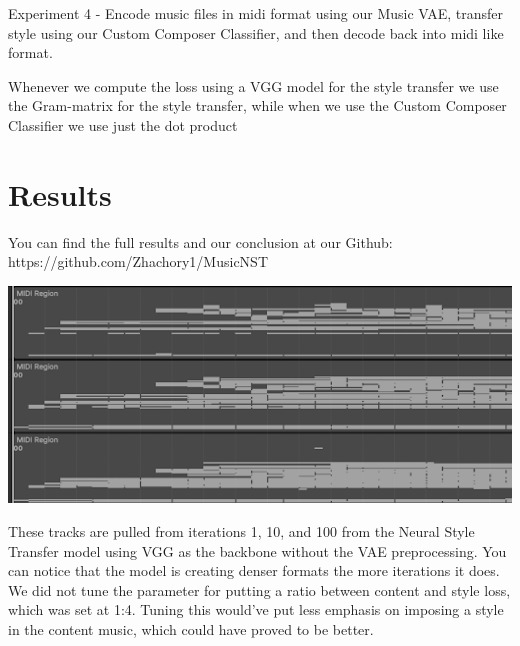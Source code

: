 \documentclass{article}
\begin{document}
Experiment 4 - Encode music files in midi format using our Music VAE, transfer style using our Custom Composer Classifier, and then decode back into midi like format.

Whenever we compute the loss using a VGG model for the style transfer we use the Gram-matrix for the style transfer, while when we use the Custom Composer Classifier we use just the dot product

\section{Results}
\label{results}

You can find the full results and our conclusion at our Github: https://github.com/Zhachory1/MusicNST

\centerline{\includegraphics[width=\columnwidth]{tracks}}

These tracks are pulled from iterations 1, 10, and 100 from the Neural Style Transfer model using VGG as the backbone without the VAE preprocessing. You can notice that the model is creating denser formats the more iterations it does. We did not tune the parameter for putting a ratio between content and style loss, which was set at 1:4. Tuning this would've put less emphasis on imposing a style in the content music, which could have proved to be better. 
\end{document}
